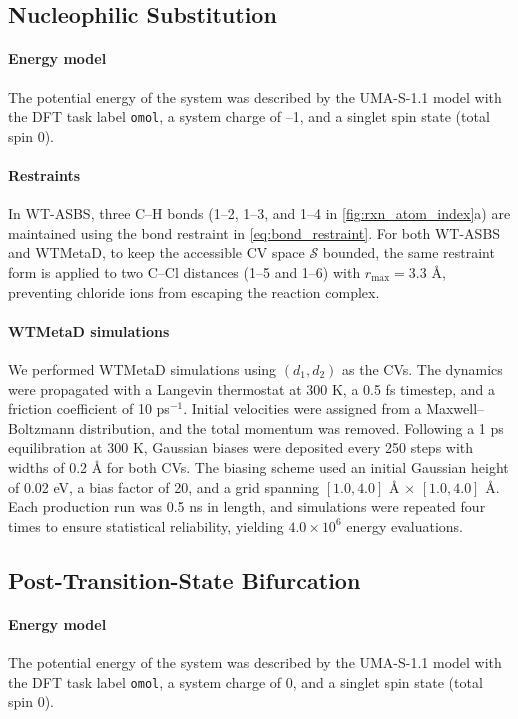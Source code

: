 \documentclass[]{fairmeta}
\theoremstyle{remark}
\begin{document}
\subsection{Nucleophilic Substitution}
\paragraph{Energy model}
The potential energy of the system was described by the UMA-S-1.1 \citep{wood2025uma} model with the DFT task label \texttt{omol}, a system charge of –1, and a singlet spin state (total spin 0).

\paragraph{Restraints}
In WT-ASBS, three C--H bonds (1--2, 1--3, and 1--4 in \cref{fig:rxn_atom_index}a) are maintained using the bond restraint in \cref{eq:bond_restraint}.
For both WT-ASBS and WTMetaD, to keep the accessible CV space $\mathcal{S}$ bounded, the same restraint form is applied to two C--Cl distances (1--5 and 1--6) with $r_\text{max} = 3.3$ \AA{}, preventing chloride ions from escaping the reaction complex.

\paragraph{WTMetaD simulations}
We performed WTMetaD simulations using $(d_1, d_2)$ as the CVs.
The dynamics were propagated with a Langevin thermostat at 300 K, a 0.5 fs timestep, and a friction coefficient of 10 ps$^{-1}$.
Initial velocities were assigned from a Maxwell--Boltzmann distribution, and the total momentum was removed.
Following a 1 ps equilibration at 300 K, Gaussian biases were deposited every 250 steps with widths of 0.2 \AA{} for both CVs.
The biasing scheme used an initial Gaussian height of 0.02 eV, a bias factor of 20, and a grid spanning $[1.0, 4.0]$ \AA{} $\times$ $[1.0, 4.0]$ \AA{}.
Each production run was 0.5 ns in length, and simulations were repeated four times to ensure statistical reliability, yielding $4.0 \times 10^6$ energy evaluations.


\subsection{Post-Transition-State Bifurcation}
\paragraph{Energy model}
The potential energy of the system was described by the UMA-S-1.1 \citep{wood2025uma} model with the DFT task label \texttt{omol}, a system charge of 0, and a singlet spin state (total spin 0).
\end{document}
